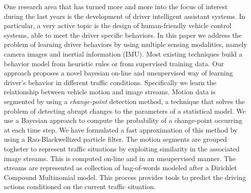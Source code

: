 One research area that has turned more and more into the focus of interest
during the last years is the development of driver intelligent assistant
systems. In particular, a very active topic is the design of human-friendly
vehicle control systems, able to meet the driver specific behaviors.
In this paper we address the problem of learning driver behaviors by using multiple sensing modalities, namely 
camera images and inertial information (IMU). 
Most existing techniques build a behavior model from heuristic
rules or from supervised training data. 
Our approach proposes a novel bayesian on-line and unsupervised way of learning driver's behavior in different traffic
conditions. Specifically we learn the relationship between vehicle motion and
image streams. 
% 
% 
% 
% 
% 
Motion data is segmented by using a \textit{change-point} detection method, a technique that solves
 the problem of detecting abrupt changes to the parameters of a statistical
model.
We use a Bayesian approach to compute the probability of a
change-point occurring at each time step. 
% 
We have formulated a
fast approximation of this method by using a Rao-Blackwellized particle
filter.  The motion segments are grouped togheter to represent traffic situations by 
exploiting similarity in the associated image streams.  This is computed on-line and in an unsupervised manner.
The streams are represented as
collection of bag-of-words modeled after a Dirichlet Compound Multinomial model. 
This process provides tools to predict the driving 
actions conditioned on the current traffic situation. 
% 

